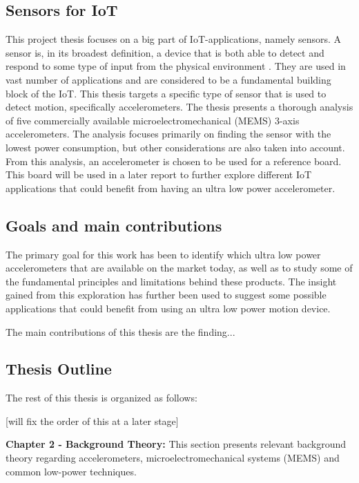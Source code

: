 \subsection{Sensors for IoT}

This project thesis focuses on a big part of IoT-applications, namely sensors. A sensor is, in its broadest definition, a device that is both able to detect and respond to some type of input from the physical environment \cite{wigmore12}. They are used in vast number of applications and are considered to be a fundamental building block of the IoT. This thesis targets a specific type of sensor that is used to detect motion, specifically accelerometers. The thesis presents a thorough analysis of five commercially available microelectromechanical (MEMS) 3-axis accelerometers. The analysis focuses primarily on finding the sensor with the lowest power consumption, but other considerations are also taken into account. From this analysis, an accelerometer is chosen to be used for a reference board. This board will be used in a later report to further explore different IoT applications that could benefit from having an ultra low power accelerometer.

\newpage

\subsection{Goals and main contributions}

The primary goal for this work has been to identify which ultra low power accelerometers that are available on the market today, as well as to study some of the fundamental principles and limitations behind these products. The insight gained from this exploration has further been used to suggest some possible applications that could benefit from using an ultra low power motion device.  

The main contributions of this thesis are the finding... 

\subsection{Thesis Outline}

The rest of this thesis is organized as follows:

[will fix the order of this at a later stage]

\textbf{Chapter 2 - Background Theory:} This section presents relevant background theory regarding accelerometers, microelectromechanical systems (MEMS) and common low-power techniques.  

